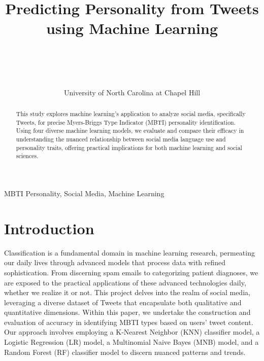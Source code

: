 \documentclass[pmlr,twocolumn]{jmlr} %
\title[Short Title]{Predicting Personality from Tweets using Machine Learning}
\author{%
  \Name{Nathan Holmes} \Email{nholmes@email.unc.edu}\\
  \Name{Namita Krishna} \Email{namitak@email.unc.edu}\\
  \Name{Andrew Mu} \Email{andylmu@email.unc.edu}\\
  \Name{Nabeel Rahman} \Email{nrahman@unc.edu}\\
  \addr University of North Carolina at Chapel Hill
 }
\begin{document}
\maketitle

\begin{abstract}
This study explores machine learning's application to analyze social media, specifically Tweets, for precise Myers-Briggs Type Indicator (MBTI) personality identification. Using four diverse machine learning models, we evaluate and compare their efficacy in understanding the nuanced relationship between social media language use and personality traits, offering practical implications for both machine learning and social sciences.
\end{abstract}
\begin{keywords}
  MBTI Personality, Social Media, Machine Learning
\end{keywords}

\section{Introduction}
\label{sec:intro}
Classification is a fundamental domain in machine learning research, permeating our daily lives through advanced models that process data with refined sophistication. From discerning spam emails to categorizing patient diagnoses, we are exposed to the practical applications of these advanced technologies daily, whether we realize it or not. This project delves into the realm of social media, leveraging a diverse dataset of Tweets that encapsulate both qualitative and quantitative dimensions. Within this paper, we undertake the construction and evaluation of accuracy in identifying MBTI types based on users' tweet content. Our approach involves employing a K-Nearest Neighbor (KNN) classifier model, a Logistic Regression (LR) model, a Multinomial Naive Bayes (MNB) model, and a Random Forest (RF) classifier model to discern nuanced patterns and trends.
\end{document}
